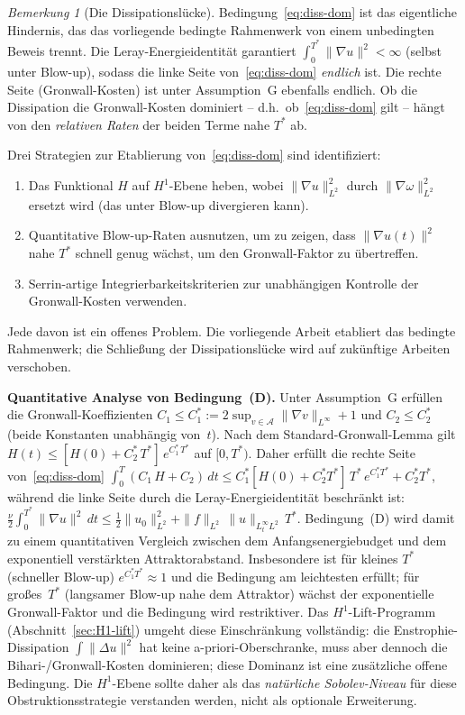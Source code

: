 \documentclass[12pt,a4paper]{article}
\theoremstyle{definition}
\theoremstyle{plain}
\theoremstyle{remark}
\newtheorem{remark}[definition]{Bemerkung}
\begin{document}
\begin{remark}[Die Dissipationslücke]\label{rem:diss-gap}
Bedingung~\eqref{eq:diss-dom} ist das eigentliche Hindernis, das
das vorliegende bedingte Rahmenwerk von einem unbedingten Beweis trennt.
Die Leray-Energieidentität garantiert
$\int_0^{T^*}\|\nabla u\|^2 < \infty$ (selbst unter Blow-up), sodass
die linke Seite von~\eqref{eq:diss-dom} \emph{endlich} ist.
Die rechte Seite (Gronwall-Kosten) ist unter Assumption~G ebenfalls endlich.
Ob die Dissipation die Gronwall-Kosten dominiert -- d.h.\ ob~\eqref{eq:diss-dom} gilt -- hängt von den \emph{relativen Raten} der beiden Terme nahe $T^*$ ab.

Drei Strategien zur Etablierung von~\eqref{eq:diss-dom} sind identifiziert:
\begin{enumerate}
  \item[\textup{(i)}]  Das Funktional $H$ auf $H^1$-Ebene heben,
    wobei $\|\nabla u\|_{L^2}^2$ durch $\|\nabla\omega\|_{L^2}^2$
    ersetzt wird (das unter Blow-up divergieren kann).
  \item[\textup{(ii)}]  Quantitative Blow-up-Raten ausnutzen, um
    zu zeigen, dass $\|\nabla u(t)\|^2$ nahe $T^*$ schnell genug wächst,
    um den Gronwall-Faktor zu übertreffen.
  \item[\textup{(iii)}]  Serrin-artige Integrierbarkeitskriterien
    zur unabhängigen Kontrolle der Gronwall-Kosten verwenden.
\end{enumerate}
Jede davon ist ein offenes Problem. Die vorliegende Arbeit etabliert
das bedingte Rahmenwerk; die Schließung der Dissipationslücke wird
auf zukünftige Arbeiten verschoben.

\medskip\noindent
\textbf{Quantitative Analyse von Bedingung~(D).}\;
Unter Assumption~G erfüllen die Gronwall-Koeffizienten
$C_1 \le C_1^* := 2\sup_{v\in\mathcal{A}}\|\nabla v\|_{L^\infty}+1$
und $C_2 \le C_2^*$ (beide Konstanten unabhängig von~$t$).
Nach dem Standard-Gronwall-Lemma gilt
$H(t) \le [H(0)+C_2^*\,T^*]\,e^{C_1^*\,T^*}$
auf $[0,T^*)$. Daher erfüllt die rechte Seite
von~\eqref{eq:diss-dom}
$\int_0^T(C_1\,H+C_2)\,dt
\le C_1^*[H(0)+C_2^*T^*]\,T^*\,e^{C_1^*T^*} + C_2^*T^*$,
während die linke Seite durch die Leray-Energieidentität beschränkt ist:
$\frac{\nu}{2}\int_0^{T^*}\|\nabla u\|^2\,dt
\le \frac{1}{2}\|u_0\|^2_{L^2}
+ \|f\|_{L^2}\,\|u\|_{L^\infty_tL^2}\,T^*$.
Bedingung~(D) wird damit zu einem quantitativen Vergleich zwischen
dem Anfangsenergiebudget und dem exponentiell verstärkten Attraktorabstand.
Insbesondere ist für kleines $T^*$ (schneller Blow-up)
$e^{C_1^*T^*} \approx 1$ und die Bedingung am leichtesten
erfüllt; für großes~$T^*$ (langsamer Blow-up nahe dem Attraktor)
wächst der exponentielle Gronwall-Faktor und die Bedingung wird
restriktiver. Das $H^1$-Lift-Programm
(Abschnitt~\ref{sec:H1-lift}) umgeht diese Einschränkung vollständig:
die Enstrophie-Dissipation $\int\|\Delta u\|^2$ hat
keine a-priori-Oberschranke, muss aber dennoch die Bihari-/Gronwall-Kosten
dominieren; diese Dominanz ist eine zusätzliche offene Bedingung.
Die $H^1$-Ebene sollte daher als das \emph{natürliche
Sobolev-Niveau} für diese Obstruktionsstrategie verstanden werden, nicht als optionale
Erweiterung.
\end{remark}
\end{document}
